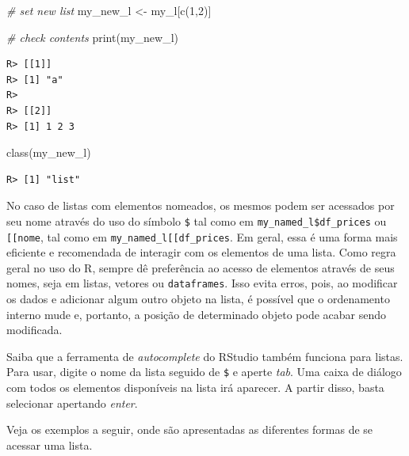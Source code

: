 \documentclass[
  11pt,
]{book}
\newenvironment{Shaded}{\begin{snugshade}}{\end{snugshade}}
\newcommand{\CommentTok}[1]{\textcolor[rgb]{0.37,0.37,0.37}{\textit{#1}}}
\newcommand{\DecValTok}[1]{\textcolor[rgb]{0.06,0.06,0.06}{#1}}
\newcommand{\FunctionTok}[1]{\textcolor[rgb]{0,0,0}{#1}}
\newcommand{\NormalTok}[1]{#1}
\newcommand{\OtherTok}[1]{\textcolor[rgb]{0.37,0.37,0.37}{#1}}
\newenvironment{rmdimportant}
{\begin{importantblock}

	} {\end{importantblock}}
\begin{document}
\begin{Shaded}
\begin{Highlighting}[]
\CommentTok{\# set new list}
\NormalTok{my\_new\_l }\OtherTok{\textless{}{-}}\NormalTok{ my\_l[}\FunctionTok{c}\NormalTok{(}\DecValTok{1}\NormalTok{,}\DecValTok{2}\NormalTok{)]}

\CommentTok{\# check contents}
\FunctionTok{print}\NormalTok{(my\_new\_l)}
\end{Highlighting}
\end{Shaded}

\begin{verbatim}
R> [[1]]
R> [1] "a"
R> 
R> [[2]]
R> [1] 1 2 3
\end{verbatim}

\begin{Shaded}
\begin{Highlighting}[]
\FunctionTok{class}\NormalTok{(my\_new\_l)}
\end{Highlighting}
\end{Shaded}

\begin{verbatim}
R> [1] "list"
\end{verbatim}

No caso de listas com elementos nomeados, os mesmos podem ser acessados por seu nome através do uso do símbolo \texttt{\$} tal como em \texttt{my\_named\_l\$df\_prices} ou \texttt{{[}{[}\textquotesingle{}nome\textquotesingle{}{]}{]}}, tal como em \texttt{my\_named\_l{[}{[}\textquotesingle{}df\_prices\textquotesingle{}{]}{]}}. Em geral, essa é uma forma mais eficiente e recomendada de interagir com os elementos de uma lista. Como regra geral no uso do R, sempre dê preferência ao acesso de elementos através de seus nomes, seja em listas, vetores ou \texttt{dataframes}. Isso evita erros, pois, ao modificar os dados e adicionar algum outro objeto na lista, é possível que o ordenamento interno mude e, portanto, a posição de determinado objeto pode acabar sendo modificada.

\begin{rmdimportant}
Saiba que a ferramenta de \emph{autocomplete} do RStudio também funciona
para listas. Para usar, digite o nome da lista seguido de \texttt{\$} e
aperte \emph{tab}. Uma caixa de diálogo com todos os elementos
disponíveis na lista irá aparecer. A partir disso, basta selecionar
apertando \emph{enter}.
\end{rmdimportant}

Veja os exemplos a seguir, onde são apresentadas as diferentes formas de se acessar uma lista.
\end{document}
